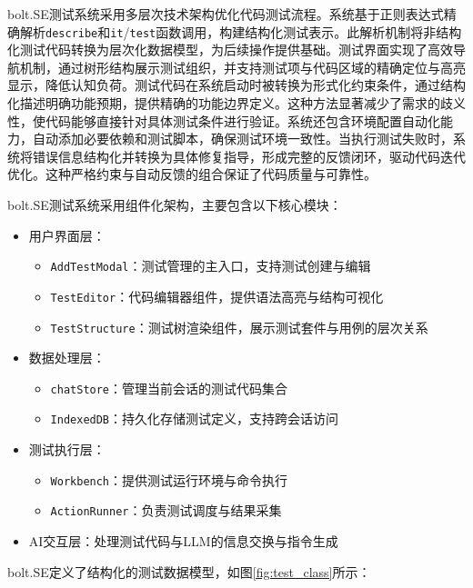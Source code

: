 bolt.SE测试系统采用多层次技术架构优化代码测试流程。系统基于正则表达式精确解析\texttt{describe}和\texttt{it}/\texttt{test}函数调用，构建结构化测试表示。此解析机制将非结构化测试代码转换为层次化数据模型，为后续操作提供基础。测试界面实现了高效导航机制，通过树形结构展示测试组织，并支持测试项与代码区域的精确定位与高亮显示，降低认知负荷。测试代码在系统启动时被转换为形式化约束条件，通过结构化描述明确功能预期，提供精确的功能边界定义。这种方法显著减少了需求的歧义性，使代码能够直接针对具体测试条件进行验证。系统还包含环境配置自动化能力，自动添加必要依赖和测试脚本，确保测试环境一致性。当执行测试失败时，系统将错误信息结构化并转换为具体修复指导，形成完整的反馈闭环，驱动代码迭代优化。这种严格约束与自动反馈的组合保证了代码质量与可靠性。

bolt.SE测试系统采用组件化架构，主要包含以下核心模块：

\begin{itemize}
  \item 用户界面层：
    \begin{itemize}
      \item \texttt{AddTestModal}：测试管理的主入口，支持测试创建与编辑
      \item \texttt{TestEditor}：代码编辑器组件，提供语法高亮与结构可视化
      \item \texttt{TestStructure}：测试树渲染组件，展示测试套件与用例的层次关系
    \end{itemize}
  
  \item 数据处理层：
    \begin{itemize}
      \item \texttt{chatStore}：管理当前会话的测试代码集合
      \item \texttt{IndexedDB}：持久化存储测试定义，支持跨会话访问
    \end{itemize}
  
  \item 测试执行层：
    \begin{itemize}
      \item \texttt{Workbench}：提供测试运行环境与命令执行
      \item \texttt{ActionRunner}：负责测试调度与结果采集
    \end{itemize}
  
  \item AI交互层：处理测试代码与LLM的信息交换与指令生成
\end{itemize}

bolt.SE定义了结构化的测试数据模型，如图\ref{fig:test_class}所示：


